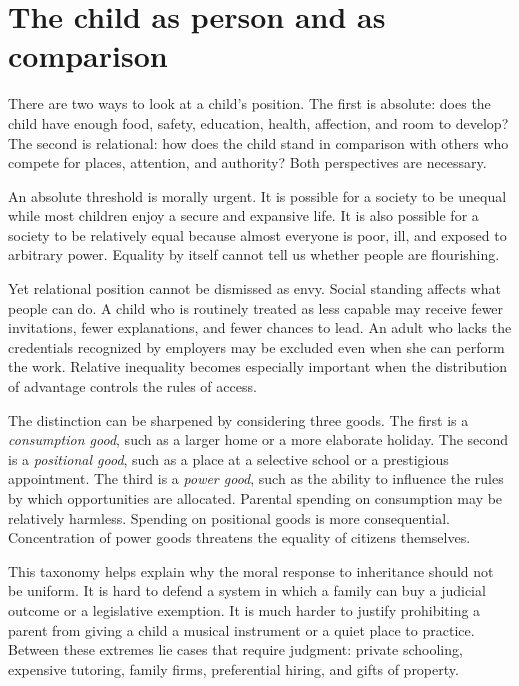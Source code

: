 ﻿\documentclass[12pt,a4paper]{book}
\begin{document}
\section{The child as person and as comparison}

There are two ways to look at a child's position.  The first is absolute:
does the child have enough food, safety, education, health, affection, and
room to develop?  The second is relational: how does the child stand in
comparison with others who compete for places, attention, and authority?
Both perspectives are necessary.

An absolute threshold is morally urgent.  It is possible for a society to
be unequal while most children enjoy a secure and expansive life.  It is
also possible for a society to be relatively equal because almost everyone
is poor, ill, and exposed to arbitrary power.  Equality by itself cannot
tell us whether people are flourishing.

Yet relational position cannot be dismissed as envy.  Social standing affects
what people can do.  A child who is routinely treated as less capable may
receive fewer invitations, fewer explanations, and fewer chances to lead.
An adult who lacks the credentials recognized by employers may be excluded
even when she can perform the work.  Relative inequality becomes especially
important when the distribution of advantage controls the rules of access.

The distinction can be sharpened by considering three goods.  The first is a
\emph{consumption good}, such as a larger home or a more elaborate holiday.
The second is a \emph{positional good}, such as a place at a selective
school or a prestigious appointment.  The third is a \emph{power good},
such as the ability to influence the rules by which opportunities are
allocated.  Parental spending on consumption may be relatively harmless.
Spending on positional goods is more consequential.  Concentration of power
goods threatens the equality of citizens themselves.

This taxonomy helps explain why the moral response to inheritance should
not be uniform.  It is hard to defend a system in which a family can buy a
judicial outcome or a legislative exemption.  It is much harder to justify
prohibiting a parent from giving a child a musical instrument or a quiet
place to practice.  Between these extremes lie cases that require judgment:
private schooling, expensive tutoring, family firms, preferential hiring,
and gifts of property.
\end{document}
